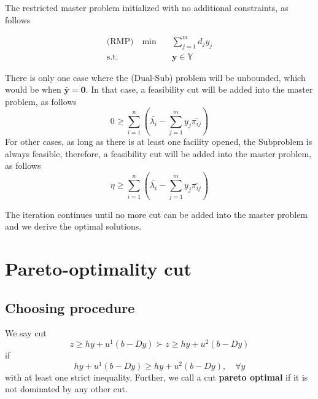                 The restricted master problem initialized with no additional constraints, as follows

                \begin{align*}
                    \text{(RMP)} \quad \min \quad & \sum_{j = 1}^m d_j y_j\\
                    \text{s.t.} \quad & \mathbf{y} \in \mathbb{Y}
                \end{align*}

                There is only one case where the (Dual-Sub) problem will be unbounded, which would be when $\bar{\mathbf{y}} = \mathbf{0}$. In that case, a feasibility cut will be added into the master problem, as follows
                \begin{equation}
                    0 \ge \sum_{i=1}^n (\bar{\lambda_i} - \sum_{j = 1}^m y_j \bar{\pi_{ij}})
                \end{equation}
                For other cases, as long as there is at least one facility opened, the Subproblem is always feasible, therefore, a feasibility cut will be added into the master problem, as follows
                \begin{equation*}
                    \eta \ge \sum_{i=1}^n (\bar{\lambda_i} - \sum_{j = 1}^m y_j \bar{\pi_{ij}})
                \end{equation*}

                The iteration continues until no more cut can be added into the master problem and we derive the optimal solutions.

        \section{Pareto-optimality cut}
            \subsection{Choosing procedure}
                \begin{definition}
                    We say cut
                    \begin{equation}
                        z \ge hy + u^1(b - Dy) \succ z \ge hy + u^2(b - Dy)
                    \end{equation}
                    if
                    \begin{equation}
                        hy + u^1(b - Dy) \ge hy + u^2(b - Dy), \quad \forall y    
                    \end{equation}
                    with at least one strict inequality. Further, we call a cut \textbf{pareto optimal} if it is not dominated by any other cut.
                \end{definition}

